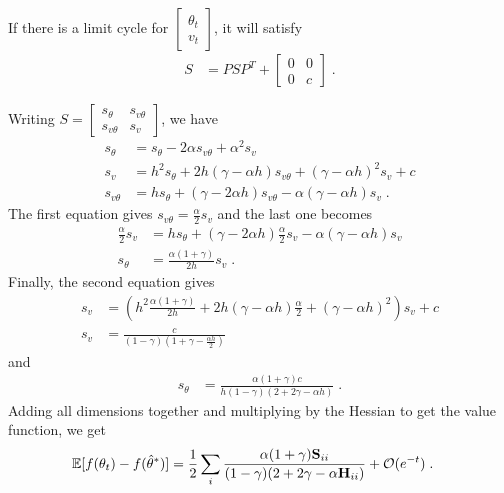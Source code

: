 If there is a limit cycle for $\displaystyle \left[
\begin{array}{c}
\theta_{t}\\
v_{t}
\end{array}
\right]$, it will satisfy
\begin{align}
    S &= PSP^T + \left[
\begin{array}{cc}
0   &   0\\
0   &   c
\end{array}
\right] \; .
\end{align}

Writing $\displaystyle S = \left[
\begin{array}{cc}
s_\theta   &   s_{v\theta}\\
s_{v\theta}   &   s_v
\end{array}
\right]$, we have
\begin{align*}
    s_\theta &= s_\theta - 2\alpha s_{v\theta} + \alpha^2 s_v\\
    s_v &=  h^2s_\theta + 2 h(\gamma - \alpha h)s_{v\theta} + (\gamma - \alpha h)^2 s_v + c\\
    s_{v\theta} &= hs_\theta + (\gamma - 2\alpha h) s_{v\theta} - \alpha(\gamma - \alpha h) s_v \; .
\end{align*}
The first equation gives $s_{v\theta} = \frac{\alpha}{2}s_v$ and the last one becomes
\begin{align*}
    \frac{\alpha}{2}s_v &= hs_\theta + (\gamma - 2\alpha h) \frac{\alpha}{2}s_v - \alpha(\gamma - \alpha h) s_v\\
    s_\theta &= \frac{\alpha (1 + \gamma)}{2h} s_v \; .
\end{align*}
Finally, the second equation gives
\begin{align*}
    s_v &=  \left(h^2\frac{\alpha (1 + \gamma)}{2h} + 2 h(\gamma - \alpha h)\frac{\alpha}{2} + (\gamma - \alpha h)^2\right) s_v + c\\
    s_v &= \frac{c}{(1 - \gamma) \left(1 + \gamma - \frac{\alpha h}{2}\right)}
\end{align*}
and
\begin{align*}
    s_\theta &= \frac{\alpha(1 + \gamma) c}{h (1 - \gamma) (2 + 2\gamma - \alpha h)} \; .
\end{align*}
Adding all dimensions together and multiplying by the Hessian to get the value function, we get
\begin{align*}
    \E[f(\theta_t) - f(\hat\theta^\ast)]    &= \frac{1}{2} \sum_i\frac{\alpha(1 + \gamma) \rmS_{ii}}{(1 - \gamma) (2 + 2\gamma - \alpha \rmH_{ii})} + \gO(e^{-t}) \; .
\end{align*}


